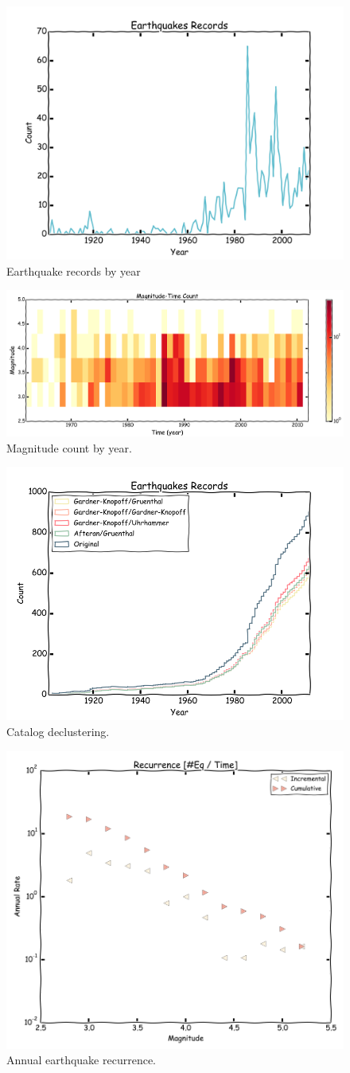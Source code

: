 \documentclass[draft, grl]{agutex}
\begin{document}

\begin{figure}
	\includegraphics[width=0.4\linewidth]{z_img_hmtk_bsb2013_rate}
	\caption{Earthquake records by year}
	\label{fig_seismic_rate}
\end{figure}


\begin{figure}
	\includegraphics[width=0.4\linewidth]{z_img_time_mag_count_br_1960}
	\caption{Magnitude count by year.}
	\label{fig_time_mag_count}
\end{figure}


\begin{figure}
	\includegraphics[width=0.4\linewidth]{z_img_decluster_br}
	\caption{Catalog declustering.}
	\label{fig_decluster}
\end{figure}


\begin{figure}
	\includegraphics[width=0.4\linewidth]{z_img_occurrence}
	\caption{Annual earthquake recurrence.}
	\label{fig_occurrence}
\end{figure}
\end{document}
